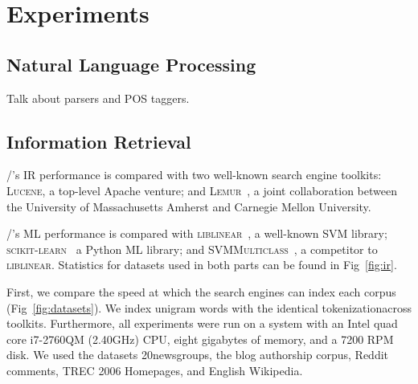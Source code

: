 \section{Experiments}

\subsection{Natural Language Processing}

Talk about parsers and POS taggers.

\subsection{Information Retrieval}

\meta/'s IR performance is compared with two well-known search engine toolkits:
\textsc{Lucene}\footnotemark[12], a top-level Apache venture; and
\textsc{Lemur}~\cite{lemur}, a joint collaboration between the University of
Massachusetts Amherst and Carnegie Mellon University.


\meta/'s ML performance is compared with \textsc{liblinear}~\cite{liblinear}, a
well-known SVM library; \textsc{scikit-learn}~\cite{scikit} a Python ML library;
and \textsc{SVMMulticlass}~\cite{svmmulticlass}, a competitor to
\textsc{liblinear}. Statistics for datasets used in both parts can be found in
Fig~\ref{fig:ir}.

First, we compare the speed at which the search engines can index each corpus
(Fig~\ref{fig:datasets}). We index unigram words with the identical
tokenization\footnotemark[1] across toolkits. Furthermore, all experiments were
run on a system with an Intel quad core i7-2760QM (2.40GHz) CPU, eight gigabytes
of memory, and a 7200 RPM disk. We used the datasets
20newsgroups\footnotemark[6], the blog authorship corpus\footnotemark[7], Reddit
comments\footnotemark[5], TREC 2006 Homepages\footnotemark[8], and English
Wikipedia\footnotemark[9].



